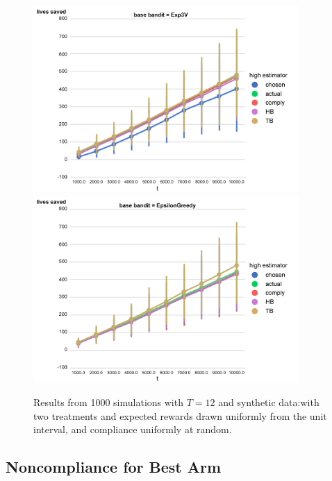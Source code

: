 \begin{figure}[t]

	\includegraphics[width=0.9\textwidth]{bandit/figs/ex3-3.jpg}\hspace{1cm}
	\includegraphics[width=0.9\textwidth]{bandit/figs/ex3-4.jpg}\hspace{1cm}
	
	\label{fig:ex3}
	\caption{Results from 1000 simulations with $T=12$ and synthetic data:with two treatments and expected rewards drawn uniformly from the unit interval, and compliance uniformly at random.}
\end{figure}





\subsection{Noncompliance for Best Arm}



